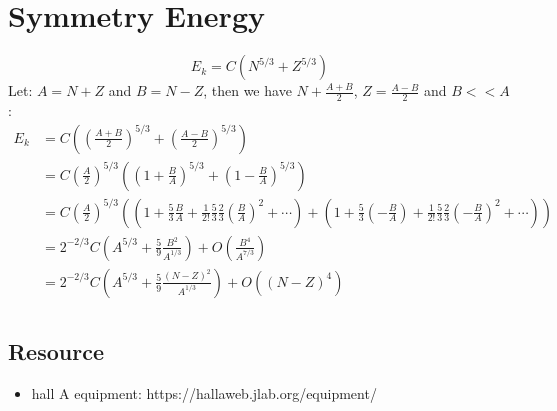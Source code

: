 \chapter{Symmetry Energy}
\label{ap:symmetry_energy}
$$ E_k = C(N^{5/3} + Z^{5/3}) $$
Let: $A = N + Z$ and $B = N - Z$, then we have $N + \frac{A+B}{2}$, 
$Z = \frac{A-B}{2}$ and $B << A$:
\begin{equation*}
    \begin{aligned}
	E_k &= C\left( \left( \frac{A+B}{2}\right)^{5/3} + \left(\frac{A-B}{2} \right)^{5/3} \right)	\\
	    &= C\left(\frac{A}{2}\right)^{5/3} \left( \left( 1 + \frac{B}{A} \right)^{5/3} + \left(1 - \frac{B}{A} \right)^{5/3} \right)   \\
	    &= C\left(\frac{A}{2}\right)^{5/3} \left( \left(1 + \frac{5}{3}\frac{B}{A} + \frac{1}{2!}\frac{5}{3}\frac{2}{3} \left( \frac{B}{A} \right)^2 + \cdots \right) 
		+ \left(1 + \frac{5}{3}\left(-\frac{B}{A} \right) + \frac{1}{2!}\frac{5}{3}\frac{2}{3} \left( -\frac{B}{A} \right)^2 + \cdots \right) \right) \\
	    &= 2^{-2/3}C\left( A^{5/3} + \frac{5}{9}\frac{B^2}{A^{1/3}} \right) + O(\frac{B^4}{A^{7/3}})	\\
	    &= 2^{-2/3}C\left( A^{5/3} + \frac{5}{9}\frac{(N-Z)^2}{A^{1/3}} \right) + O((N-Z)^4)	\\
    \end{aligned}
\end{equation*}

\section{Resource}
\begin{itemize}
    \item hall A equipment: https://hallaweb.jlab.org/equipment/
\end{itemize}
